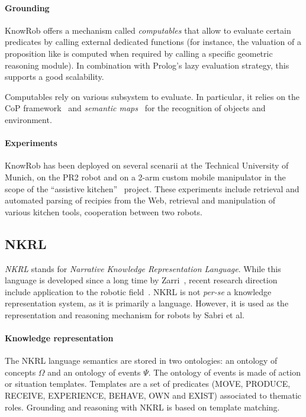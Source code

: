 \paragraph{Grounding} {\sc KnowRob} offers a mechanism called \emph{computables} that allow to
evaluate certain predicates by calling external dedicated functions (for
instance, the valuation of a proposition like  is
computed when required by calling a specific geometric reasoning module). In
combination with Prolog's lazy evaluation strategy, this supports a good
scalability.

Computables rely on various subsystem to evaluate. In particular, it relies on
the CoP framework~\cite{Klank2009} and \emph{semantic maps}~\cite{Blodow2011}
for the recognition of objects and environment.


\paragraph{Experiments} {\sc KnowRob} has been deployed on several scenarii at
the Technical University of Munich, on the PR2 robot and on a 2-arm custom
mobile manipulator in the scope of the ``assistive kitchen''~\cite{Beetz2008}
project. These experiments include retrieval and automated parsing of recipies
from the Web, retrieval and manipulation of various kitchen tools, cooperation
between two robots.

\subsection{NKRL}
\label{sect|nkrl}

\emph{NKRL} stands for \emph{Narrative Knowledge Representation Language}.
While this language is developed since a long time by Zarri~\cite{Zarri1997,
Zarri2008}, recent research direction include application to the robotic
field~\cite{Sabri2011}. NKRL is not {\it per-se} a knowledge representation
system, as it is primarily a language. However, it is used as the
representation and reasoning mechanism for robots by Sabri et al.

\paragraph{Knowledge representation} The NKRL language semantics are stored in
two ontologies: an ontology of concepts $\Omega$ and an ontology of events
$\Psi$. The ontology of events is made of action or situation templates.
Templates are a set of predicates (MOVE, PRODUCE, RECEIVE, EXPERIENCE, BEHAVE,
OWN and EXIST) associated to thematic roles. Grounding and reasoning with NKRL
is based on template matching.

